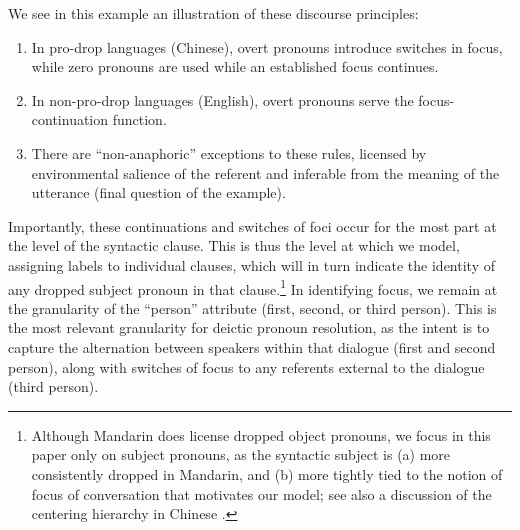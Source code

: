 \documentclass[11pt]{report}
\renewcommand\cite{\citep}	%
\begin{document}
We see in this example an illustration of these discourse principles:
\begin{enumerate} \itemsep1pt \parskip0pt 
\item In pro-drop languages (Chinese), overt pronouns introduce switches in focus, while zero pronouns are used while an established focus continues.
\item In non-pro-drop languages (English), overt pronouns serve the focus-continuation function.
\item There are  ``non-anaphoric'' exceptions to these rules, licensed by environmental salience of the referent and inferable from the meaning of the utterance (final question of the example).
\end{enumerate}

Importantly, these continuations and switches of foci occur for the most part at the level of the syntactic clause. This is thus the level at which we model, assigning labels to individual clauses, which will in turn indicate the identity of any dropped subject pronoun in that clause.\footnote{Although Mandarin does license dropped object pronouns, we focus in this paper only on subject pronouns, as the syntactic subject is (a) more consistently dropped in Mandarin, and (b) more tightly tied to the notion of focus of conversation that motivates our model; see also a discussion of the centering hierarchy in Chinese \cite{chincent}.} In identifying focus, we remain at the granularity of the ``person'' attribute (first, second, or third person). This is the most relevant granularity for deictic pronoun resolution, as the intent is to capture the alternation between speakers within that dialogue (first and second person), along with switches of focus to any referents external to the dialogue (third person). %
\end{document}
